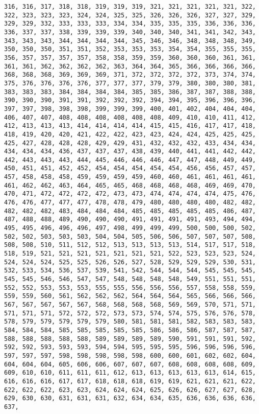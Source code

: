 \documentclass[11pt]{article}
\begin{document}
\begin{Verbatim}[commandchars=\\\{\}]
316, 316, 317, 318, 318, 319, 319, 319, 321, 321, 321, 321, 321, 322, 322, 323, 323, 323, 324, 324, 325, 325, 326, 326, 326, 327, 327, 329, 329, 329, 332, 333, 333, 333, 334, 334, 335, 335, 335, 336, 336, 336, 336, 337, 337, 338, 339, 339, 339, 340, 340, 340, 341, 341, 342, 343, 343, 343, 343, 344, 344, 344, 344, 345, 346, 346, 348, 348, 348, 349, 350, 350, 350, 351, 351, 352, 353, 353, 353, 354, 354, 355, 355, 355, 356, 357, 357, 357, 357, 358, 358, 359, 359, 360, 360, 360, 361, 361, 361, 361, 362, 362, 362, 362, 363, 364, 364, 365, 366, 366, 366, 366, 368, 368, 368, 369, 369, 369, 371, 372, 372, 372, 372, 373, 374, 374, 375, 376, 376, 376, 376, 377, 377, 377, 379, 379, 380, 380, 380, 381, 383, 383, 383, 384, 384, 384, 384, 385, 385, 386, 387, 387, 388, 388, 390, 390, 390, 391, 391, 392, 392, 392, 394, 394, 395, 396, 396, 396, 397, 397, 398, 398, 398, 399, 399, 399, 400, 401, 402, 404, 404, 404, 406, 407, 407, 408, 408, 408, 408, 408, 408, 409, 410, 410, 411, 412, 412, 413, 413, 413, 414, 414, 414, 414, 415, 415, 416, 417, 417, 418, 418, 419, 420, 420, 421, 422, 422, 423, 423, 424, 424, 425, 425, 425, 425, 427, 428, 428, 428, 429, 429, 431, 432, 432, 432, 433, 434, 434, 434, 434, 434, 436, 437, 437, 437, 438, 439, 440, 441, 441, 442, 442, 442, 443, 443, 443, 444, 445, 446, 446, 446, 447, 447, 448, 449, 449, 450, 451, 451, 452, 452, 454, 454, 454, 454, 454, 456, 456, 457, 457, 457, 458, 458, 458, 459, 459, 459, 459, 460, 460, 461, 461, 461, 461, 461, 462, 462, 463, 464, 465, 465, 468, 468, 468, 468, 469, 469, 470, 470, 471, 472, 472, 472, 472, 473, 473, 474, 474, 474, 474, 475, 476, 476, 476, 477, 477, 477, 478, 478, 479, 480, 480, 480, 480, 482, 482, 482, 482, 482, 483, 484, 484, 484, 485, 485, 485, 485, 485, 486, 487, 487, 488, 488, 489, 490, 490, 490, 491, 491, 491, 491, 493, 494, 494, 495, 495, 496, 496, 496, 497, 498, 499, 499, 499, 500, 500, 500, 502, 502, 502, 503, 503, 503, 504, 504, 505, 506, 506, 507, 507, 507, 508, 508, 508, 510, 511, 512, 512, 513, 513, 513, 513, 514, 517, 517, 518, 518, 519, 521, 521, 521, 521, 521, 521, 521, 522, 523, 523, 523, 524, 524, 524, 524, 525, 525, 526, 526, 527, 528, 529, 529, 529, 530, 531, 532, 533, 534, 536, 537, 539, 541, 542, 544, 544, 544, 545, 545, 545, 545, 545, 546, 546, 547, 547, 548, 548, 548, 548, 549, 551, 551, 551, 552, 552, 553, 553, 553, 555, 555, 556, 556, 556, 557, 558, 558, 559, 559, 559, 560, 561, 562, 562, 562, 564, 564, 564, 565, 566, 566, 566, 567, 567, 567, 567, 567, 568, 568, 568, 568, 569, 569, 570, 571, 571, 571, 571, 571, 572, 572, 572, 573, 573, 574, 574, 575, 576, 576, 578, 578, 579, 579, 579, 579, 579, 580, 581, 581, 581, 582, 583, 583, 583, 584, 584, 584, 585, 585, 585, 585, 585, 586, 586, 586, 587, 587, 587, 588, 588, 588, 588, 588, 589, 589, 589, 589, 590, 591, 591, 591, 592, 592, 592, 593, 593, 593, 594, 594, 595, 595, 595, 596, 596, 596, 596, 597, 597, 597, 598, 598, 598, 598, 598, 600, 600, 601, 602, 602, 604, 604, 604, 604, 605, 606, 606, 607, 607, 607, 608, 608, 608, 608, 609, 609, 610, 610, 611, 611, 611, 612, 613, 613, 613, 613, 613, 614, 615, 616, 616, 616, 617, 617, 618, 618, 618, 619, 619, 621, 621, 621, 622, 622, 622, 622, 623, 623, 624, 624, 624, 625, 626, 626, 627, 627, 628, 629, 630, 630, 631, 631, 631, 632, 634, 634, 635, 636, 636, 636, 636, 637, 
\end{Verbatim}
\end{document}
